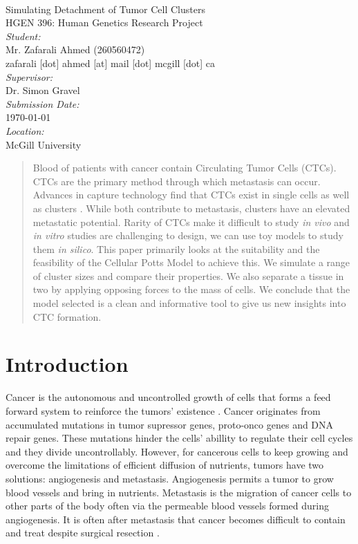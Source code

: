 \documentclass[12pt]{article}
\begin{document}
\begin{titlepage}
	\begin{center}
		~\\[2.0cm]
		{\Huge Simulating Detachment of Tumor Cell Clusters}\\[1.5cm]
		{\Large HGEN 396: Human Genetics Research Project}\\[6.5cm]
		\emph{Student:}\\
		Mr. Zafarali Ahmed (260560472)\\
		{\scriptsize zafarali [dot] ahmed [at] mail [dot] mcgill [dot] ca} \\[1.0cm]
		\emph{Supervisor:}\\
		Dr. Simon Gravel\\[1.0cm]
		\emph{Submission Date:}\\
		\today\\[1.0cm]
		\emph{Location:}\\
		McGill University
	\end{center}
\end{titlepage}

\begin{abstract}
Blood of patients with cancer contain Circulating Tumor Cells (CTCs). CTCs are the primary method through which metastasis can occur. Advances in capture technology find that CTCs exist in single cells as well as clusters \cite{Aceto2014}. While both contribute to metastasis, clusters have an elevated metastatic potential. Rarity of CTCs make it difficult to study \emph{in vivo} and \emph{in vitro} studies are challenging to design, we can use toy models to study them \emph{in silico}. This paper primarily looks at the suitability and the feasibility of the Cellular Potts Model to achieve this. We simulate a range of cluster sizes and compare their properties. We also separate a tissue in two by applying opposing forces to the mass of cells. We conclude that the model selected is a clean and informative tool to give us new insights into CTC formation.
\end{abstract}

\section{Introduction}
Cancer is the autonomous and uncontrolled growth of cells that forms a feed forward system to reinforce the tumors’ existence \cite{hallmarks}. Cancer originates from accumulated mutations in tumor supressor genes, proto-onco genes and DNA repair genes. These mutations hinder the cells' abillity to regulate their cell cycles and they divide uncontrollably. However, for cancerous cells to keep growing and overcome the limitations of efficient diffusion of nutrients, tumors have two solutions: angiogenesis and metastasis. Angiogenesis permits a tumor to grow blood vessels and bring in nutrients. Metastasis is the migration of cancer cells to other parts of the body often via the permeable blood vessels formed during angiogenesis. It is often after metastasis that cancer becomes difficult to contain and treat despite surgical resection \cite{Demicheli2008}.
\end{document}
